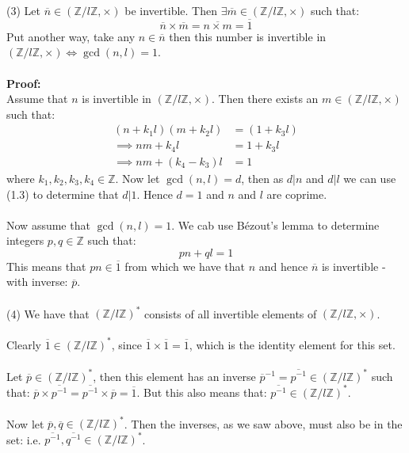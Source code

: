 \documentclass[12pt,a4paper]{article}
\begin{document}
\newpage
\noindent
(3) Let $\overline{n} \in (\mathbb{Z} / l\mathbb{Z}, \times)$ be invertible.  Then $\exists \overline{m} \in (\mathbb{Z} / l\mathbb{Z}, \times)$ such that:
$$\overline{n}\times \overline{m} = \overline{n \times m} = \overline{1}$$
Put another way, take any $n \in \overline{n}$ then this number is invertible in $(\mathbb{Z} / l\mathbb{Z}, \times) \iff \gcd(n,l)=1$.\\
\\
\textbf{Proof:}\\
Assume that $n$ is invertible in $(\mathbb{Z} / l\mathbb{Z}, \times)$.  Then there exists an $m \in (\mathbb{Z} / l\mathbb{Z}, \times)$ such that:
\begin{align*}
    (n + k_1 l)(m + k_2 l) &= (1 + k_3 l) \\
\implies nm + k_4 l &= 1 + k_3 l \\
\implies nm + (k_4-k_3)l &= 1 \tag{1.3}
\end{align*}
where $k_1,k_2,k_3,k_4 \in \mathbb{Z}$.  Now let $\gcd(n,l)=d$, then as $d|n$ and $d|l$ we can use (1.3) to determine that $d|1$.
Hence $d=1$ and $n$ and $l$ are coprime.\\
\\
Now assume that $\gcd(n,l)=1$. We cab use Bézout’s lemma to determine integers $p,q \in \mathbb{Z}$ such that:
$$ pn + ql = 1$$
This means that $pn \in \overline{1}$ from which we have that $n$ and hence $\overline{n}$ is invertible - with inverse: $\overline{p}$.\\
\\
(4) We have that $(\mathbb{Z} / l\mathbb{Z})^*$ consists of all invertible elements of $(\mathbb{Z} / l\mathbb{Z}, \times)$.\\
\\
Clearly $\overline{1} \in (\mathbb{Z} / l\mathbb{Z})^*$, since $\overline{1} \times \overline{1} = \overline{1}$, which is the
identity element for this set.\\
\\
Let $\overline{p} \in (\mathbb{Z} / l\mathbb{Z})^*$, then this element has an inverse $\overline{p}^{-1} = \overline{p^{-1}} \in (\mathbb{Z} / l\mathbb{Z})^*$ such that:
$\overline{p} \times \overline{p^{-1}} = \overline{p^{-1}} \times \overline{p} = \overline{1}$.  But this also means that: $\overline{p^{-1}} \in (\mathbb{Z} / l\mathbb{Z})^*$.\\
\\
Now let $\overline{p}, \overline{q} \in (\mathbb{Z} / l\mathbb{Z})^*$.  Then the inverses, as we saw above, must also be in the set: i.e. $\overline{p^{-1}}, \overline{q^{-1}} \in (\mathbb{Z} / l\mathbb{Z})^*$.\\
\end{document}
